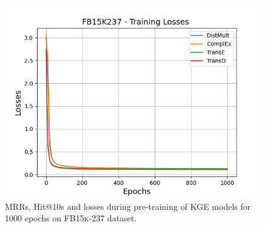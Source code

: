 \begin{figure}[H]
\begin{minipage}{.3\textwidth}
      \includegraphics[width=\linewidth]{figures/results/pretrain/fb15k237/pretrain_fb15k237_losses.png}
    \end{minipage}%
    \caption{MRRs, Hit@10s and losses during pre-training of \ac{KGE} models for 1000 epochs on \textsc{FB15k-237} dataset.}
    \label{fig:pretraining}
\end{figure}
